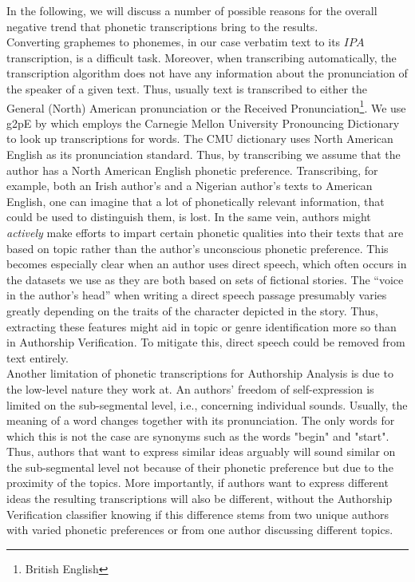 In the following, we will discuss a number of possible reasons for the overall negative trend that phonetic transcriptions bring to the results.\\
Converting graphemes to phonemes, in our case verbatim text to its $IPA$ transcription, is a difficult task.
Moreover, when transcribing automatically, the transcription algorithm does not have any information about the pronunciation of the speaker of a given text.
Thus, usually text is transcribed to either the General (North) American pronunciation or the Received Pronunciation\footnote{British English}.
We use g2pE by \cite{kyubyong2019g2pE} which employs the Carnegie Mellon University Pronouncing Dictionary to look up transcriptions for words.
The CMU dictionary uses North American English as its pronunciation standard.
Thus, by transcribing we assume that the author has a North American English phonetic preference.
Transcribing, for example, both an Irish author's and a Nigerian author's texts to American English, one can imagine that a lot of phonetically relevant information, that could be used to distinguish them, is lost.
In the same vein, authors might \textit{actively} make efforts to impart certain phonetic qualities into their texts that are based on topic rather than the author's unconscious phonetic preference.
This becomes especially clear when an author uses direct speech, which often occurs in the datasets we use as they are both based on sets of fictional stories.
The ``voice in the author's head'' when writing a direct speech passage presumably varies greatly depending on the traits of the character depicted in the story.
Thus, extracting these features might aid in topic or genre identification more so than in Authorship Verification.
To mitigate this, direct speech could be removed from text entirely.\\
Another limitation of phonetic transcriptions for Authorship Analysis is due to the low-level nature they work at.
An authors' freedom of self-expression is limited on the sub-segmental level, i.e., concerning individual sounds.
Usually, the meaning of a word changes together with its pronunciation.
The only words for which this is not the case are synonyms such as the words "begin" and "start".
Thus, authors that want to express similar ideas arguably will sound similar on the sub-segmental level not because of their phonetic preference but due to the proximity of the topics.
More importantly, if authors want to express different ideas the resulting transcriptions will also be different, without the Authorship Verification classifier knowing if this difference stems from two unique authors with varied phonetic preferences or from one author discussing different topics.
